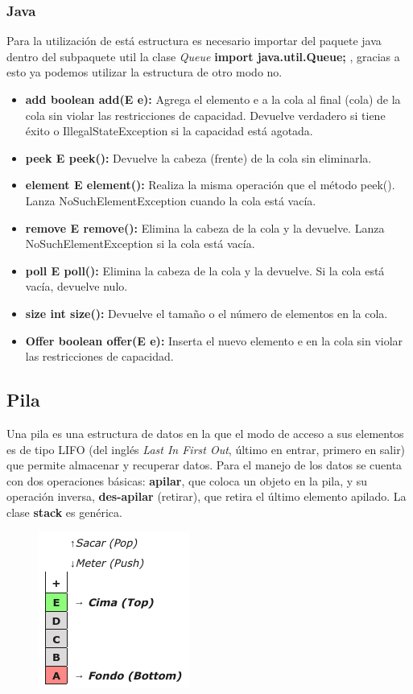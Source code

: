 \subsubsection{Java}

Para la utilización de está estructura es necesario importar del paquete java dentro del subpaquete util la clase \emph{Queue} \textbf{import java.util.Queue;} , gracias a esto ya podemos utilizar la estructura de otro modo no.

\begin{itemize}
	\item \textbf{add boolean add(E e):} Agrega el elemento e a la cola al final (cola) de la cola sin violar las restricciones de capacidad. Devuelve verdadero si tiene éxito o IllegalStateException si la capacidad está agotada.
	\item \textbf{peek E peek():} Devuelve la cabeza (frente) de la cola sin eliminarla.
	\item \textbf{element E element():} Realiza la misma operación que el método peek(). Lanza NoSuchElementException cuando la cola está vacía.
	\item \textbf{remove E remove():} Elimina la cabeza de la cola y la devuelve. Lanza NoSuchElementException si la cola está vacía.
	\item \textbf{poll E poll():} Elimina la cabeza de la cola y la devuelve. Si la cola está vacía, devuelve nulo.
	\item \textbf{size int size():} Devuelve el tamaño o el número de elementos en la cola.
	\item \textbf{Offer	boolean offer(E e):} Inserta el nuevo elemento e en la cola sin violar las restricciones de capacidad.
\end{itemize}

\subsection{Pila}

Una pila es una estructura de datos en la que el modo de acceso a sus elementos es de tipo LIFO (del
inglés \emph{Last In First Out}, último en entrar, primero en salir) que permite almacenar y recuperar datos.
Para el manejo de los datos se cuenta con dos operaciones básicas: \textbf{apilar}, que coloca un objeto en
la pila, y su operación inversa, \textbf{des-apilar} (retirar), que retira el último elemento apilado.
La clase \textbf{stack} es genérica.

\begin{figure}[h!]
	\centering
	\includegraphics[width=0.20\linewidth]{img/pila}
	\label{fig:pila}
\end{figure}



